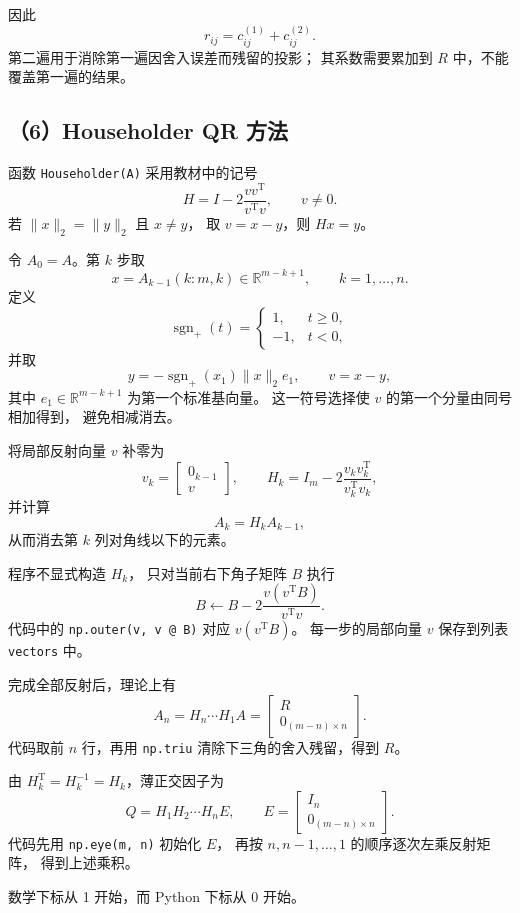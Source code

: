 \documentclass[UTF8,a4paper,11pt,fontset=fandol]{ctexart}
\begin{document}
因此
\[
r_{ij}=c_{ij}^{(1)}+c_{ij}^{(2)}.
\]
第二遍用于消除第一遍因舍入误差而残留的投影；
其系数需要累加到 $R$ 中，不能覆盖第一遍的结果。

\subsection*{（6）Householder QR 方法}

函数 \texttt{Householder(A)} 采用教材中的记号
\[
H=I-2\frac{vv^{\mathrm T}}{v^{\mathrm T}v},
\qquad v\ne0.
\]
若 $\|x\|_2=\|y\|_2$ 且 $x\ne y$，
取 $v=x-y$，则 $Hx=y$。

令 $A_0=A$。第 $k$ 步取
\[
x=A_{k-1}(k:m,k)\in\mathbb R^{m-k+1},
\qquad k=1,\ldots,n.
\]
定义
\[
\operatorname{sgn}_+(t)=
\begin{cases}
1,&t\ge0,\\
-1,&t<0,
\end{cases}
\]
并取
\[
y=-\operatorname{sgn}_+(x_1)\|x\|_2e_1,
\qquad v=x-y,
\]
其中 $e_1\in\mathbb R^{m-k+1}$ 为第一个标准基向量。
这一符号选择使 $v$ 的第一个分量由同号相加得到，
避免相减消去。

将局部反射向量 $v$ 补零为
\[
v_k=
\begin{bmatrix}
0_{k-1}\\v
\end{bmatrix},
\qquad
H_k=I_m-2\frac{v_kv_k^{\mathrm T}}{v_k^{\mathrm T}v_k},
\]
并计算
\[
A_k=H_kA_{k-1},
\]
从而消去第 $k$ 列对角线以下的元素。

程序不显式构造 $H_k$，
只对当前右下角子矩阵 $B$ 执行
\[
B\leftarrow B-2\frac{v(v^{\mathrm T}B)}{v^{\mathrm T}v}.
\]
代码中的 \texttt{np.outer(v, v @ B)}
对应 $v(v^{\mathrm T}B)$。
每一步的局部向量 $v$
保存到列表 \texttt{vectors} 中。

完成全部反射后，理论上有
\[
A_n=H_n\cdots H_1A
=
\begin{bmatrix}
R\\0_{(m-n)\times n}
\end{bmatrix}.
\]
代码取前 $n$ 行，再用 \texttt{np.triu}
清除下三角的舍入残留，得到 $R$。

由 $H_k^{\mathrm T}=H_k^{-1}=H_k$，薄正交因子为
\[
Q=H_1H_2\cdots H_nE,
\qquad
E=
\begin{bmatrix}
I_n\\0_{(m-n)\times n}
\end{bmatrix}.
\]
代码先用 \texttt{np.eye(m, n)} 初始化 $E$，
再按 $n,n-1,\ldots,1$ 的顺序逐次左乘反射矩阵，
得到上述乘积。

数学下标从 1 开始，而 Python 下标从 0 开始。
\end{document}
